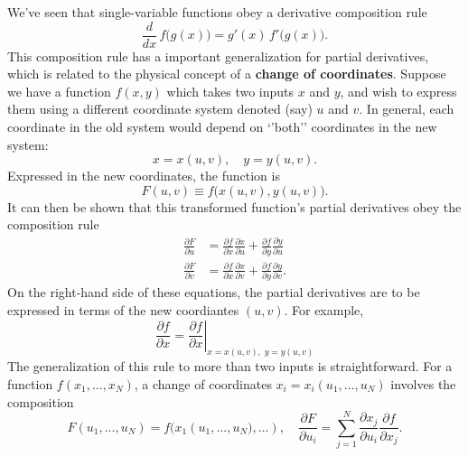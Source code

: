 \documentclass[10pt,a4paper]{article}
\begin{document}
We've seen that single-variable functions obey a derivative
composition rule
\begin{equation}
  \frac{d}{dx}\, f\big(g(x)\big) = g'(x) \, f'\big(g(x)\big).
\end{equation}
This composition rule has a important generalization for partial
derivatives, which is related to the physical concept of a
\textbf{change of coordinates}. Suppose we have a function $f(x,y)$
which takes two inputs $x$ and $y$, and wish to express them using a
different coordinate system denoted (say) $u$ and $v$. In general,
each coordinate in the old system would depend on `'both'' coordinates
in the new system:
\begin{equation}
  x = x(u,v), \quad y = y(u,v).
\end{equation}
Expressed in the new coordinates, the function is
\begin{equation}
F(u,v) \equiv f\big(x(u,v), y(u,v)\big).
\end{equation}
It can then be shown that this transformed function's partial
derivatives obey the composition rule
\begin{align}
  \frac{\partial F}{\partial u} &= \frac{\partial f}{\partial x} \frac{\partial x}{\partial u} + \frac{\partial f}{\partial y} \frac{\partial y}{\partial u}\\
  \frac{\partial F}{\partial v} &= \frac{\partial f}{\partial x} \frac{\partial x}{\partial v} + \frac{\partial f}{\partial y} \frac{\partial y}{\partial v}.
\end{align}
On the right-hand side of these equations, the partial derivatives are
to be expressed in terms of the new coordiantes $(u,v)$. For example,
\begin{equation}
  \frac{\partial f}{\partial x} = \left.\frac{\partial f}{\partial x}\right|_{x = x(u,v), \;y= y(u,v)}
\end{equation}
The generalization of this rule to more than two inputs is
straightforward. For a function $f(x_1, \dots, x_N)$, a change of
coordinates $x_i = x_i(u_1, \dots, u_N)$ involves the composition
\begin{equation}
F(u_1, \dots, u_N) = f\big(x_1(u_1,\dots,u_N\big), \dots), \quad \frac{\partial F}{\partial u_i} = \sum_{j=1}^N \frac{\partial x_j}{\partial u_i} \frac{\partial f}{\partial x_j}.
\end{equation}
\end{document}
